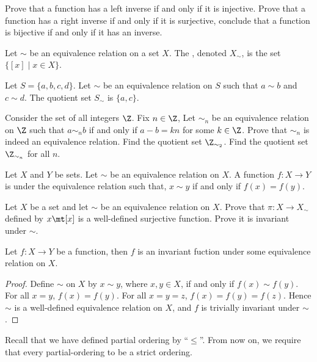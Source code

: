 \documentclass[10pt]{article}
\begin{document}
\begin{problem}
    Prove that a function has a left inverse if and only if it is injective. Prove that a function has a right inverse if and only if it is surjective, conclude that a function is bijective if and only if it has an inverse.
\end{problem}
\begin{definition}
    Let $\sim$ be an equivalence relation on a set $X$. The , denoted ${X}_{\sim}$, is the set $\{[x]\mid x\in X\}$.
\end{definition}
\begin{example}
    Let $S=\{a,b,c,d\}$. Let $\sim$ be an equivalence relation on $S$ such that $a\sim b$ and $c\sim d$. The quotient set ${S}_{\sim}$ is $\{a,c\}$.
\end{example}
\begin{problem}
    Consider the set of all integers $\Z$. Fix $n\in\Z$, Let ${\sim}_{n}$ be an equivalence relation on $\Z$ such that $a{\sim}_{n}b$ if and only if $a-b=kn$ for some $k\in\Z$. Prove that ${\sim}_{n}$ is indeed an equivalence relation. Find the quotient set ${\Z}_{{\sim}_{2}}$. Find the quotient set ${\Z}_{{\sim}_{n}}$ for all $n$. 
\end{problem}
\begin{definition}
    Let $X$ and $Y$ be sets. Let $\sim$ be an equivalence relation on $X$. A function $f:X\to Y$ is  under the equivalence relation such that, $x\sim y$ if and only if $f(x)=f(y)$.
\end{definition}
\begin{problem}
    Let $X$ be a set and let $\sim$ be an equivalence relation on $X$. Prove that $\pi:X\to{X}_{\sim}$ defined by $x\mt[x]$ is a well-defined surjective function. Prove it is invariant under $\sim$.
\end{problem}
\begin{proposition}
    Let $f:X\to Y$ be a function, then $f$ is an invariant fuction under some equivalence relation on $X$.
\end{proposition}
\begin{proof}
    Define $\sim$ on $X$ by $x\sim y$, where $x,y\in X$, if and only if $f(x)\sim f(y)$. For all $x=y$, $f(x)=f(y)$. For all $x=y=z$, $f(x)=f(y)=f(z)$. Hence $\sim$ is a well-defined equivalence relation on $X$, and $f$ is trivially invariant under $\sim$.
\end{proof} 
\par
Recall that we have defined partial ordering by ``$\le$''. From now on, we require that every partial-ordering to be a strict ordering.
\end{document}
